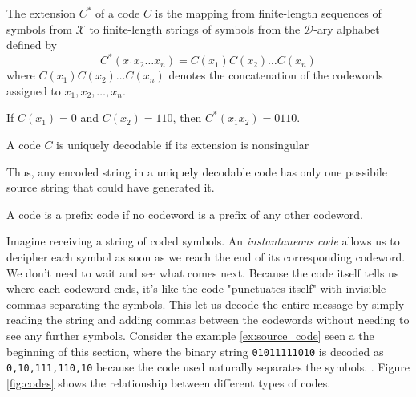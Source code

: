 \begin{definition}\label{def:extension_code}
    The extension $C^*$ of a code $C$ is the mapping from finite-length sequences of symbols from $\mathcal{X}$ to finite-length strings of symbols from the $\mathcal{D}$-ary alphabet defined by
    \begin{equation}
        C^*(x_1x_2\ldots x_n) = C(x_1)C(x_2)\ldots C(x_n)
    \end{equation}
    where $C(x_1)C(x_2)\ldots C(x_n)$ denotes the concatenation of the codewords assigned to $x_1, x_2, \ldots, x_n$.
\end{definition}

\begin{example}
    If $C(x_1) = 0$ and $C(x_2) = 110$, then $C^*(x_1x_2) = 0110$.
\end{example}

\begin{definition}\label{def:unique_decodability}
    A code $C$ is uniquely decodable if its extension is nonsingular
\end{definition}

\noindent Thus, any encoded string in a uniquely decodable code has only one possibile source string that could have generated it.

\begin{definition}\label{def:prefix_code}
    A  code is a prefix code if no codeword is a prefix of any other codeword.
\end{definition}

\noindent Imagine receiving a string of coded symbols. An \emph{instantaneous code} allows us to decipher each symbol as soon as we reach the end of its corresponding codeword. We don't need to wait and see what comes next. Because the code itself tells us where each codeword ends, it's like the code "punctuates itself" with invisible commas separating the symbols.  This let us decode the entire message by simply reading the string and adding commas between the codewords without needing to see any further symbols. Consider the example \ref{ex:source_code} seen a the beginning of this section, where the binary string \texttt{01011111010} is decoded as \texttt{0,10,111,110,10} because the code used naturally separates the symbols. \cite{ElementsofInformationTheory}. Figure \ref{fig:codes} shows the relationship between different types of codes.


